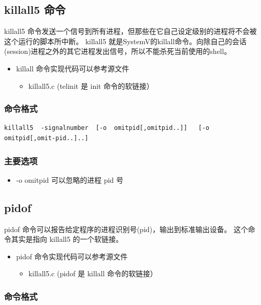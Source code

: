 \subsection{killall5 命令}

killall5
命令发送一个信号到所有进程，但那些在它自己设定级别的进程将不会被这个运行的脚本所中断。
killall5
就是SystemV的killall命令。向除自己的会话(session)进程之外的其它进程发出信号，所以不能杀死当前使用的shell。

\begin{itemize}
\item
  killall 命令实现代码可以参考源文件
  \begin{itemize}
  \item
    killall5.c (telinit 是 init 命令的软链接）
  \end{itemize}
\end{itemize}
\subsubsection{命令格式}

{\begin{shaded}\begin{verbatim}
killall5  -signalnumber  [-o  omitpid[,omitpid..]]   [-o omitpid[,omit‐pid..]..]
\end{verbatim}\end{shaded}}
\subsubsection{主要选项}

\begin{itemize}
\item
  -o omitpid 可以忽略的进程 pid 号
\end{itemize}
\subsection{pidof}

pidof 命令可以报告给定程序的进程识别号(pid)，输出到标准输出设备。
这个命令其实是指向 killall5 的一个软链接。

\begin{itemize}
\item
  pidof 命令实现代码可以参考源文件
  \begin{itemize}
  \item
    killall5.c (pidof 是 killall 命令的软链接）
  \end{itemize}
\end{itemize}
\subsubsection{命令格式}

